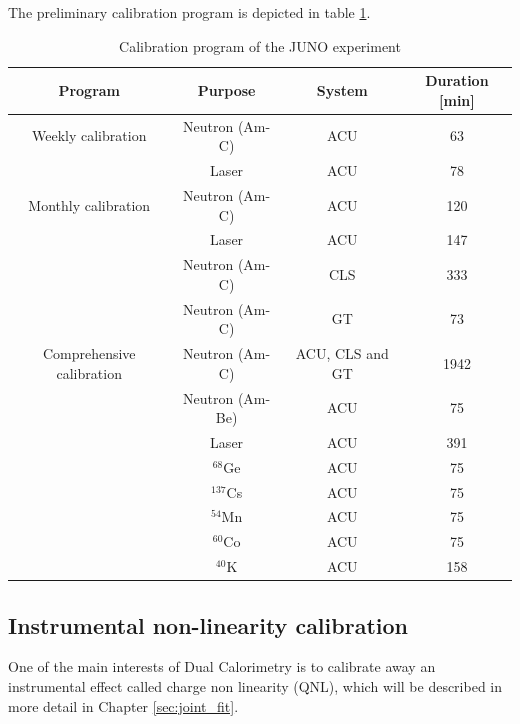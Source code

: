 \documentclass[../main.tex]{subfiles}
\begin{document}
The preliminary calibration program is depicted in table \ref{tab:juno:calib_prog}.

\begin{table}[ht]
  \centering
  \begin{tabular}{c c c c}
    \hline
    Program & Purpose & System & Duration [min] \\
    \hline
    Weekly calibration & Neutron (Am-C) & ACU & 63 \\
                       & Laser & ACU & 78  \\
                       \hline
    Monthly calibration & Neutron (Am-C) & ACU & 120 \\
                        & Laser  & ACU  & 147 \\
                        & Neutron (Am-C) & CLS & 333 \\
                        & Neutron (Am-C) & GT  & 73  \\
                        \hline
    Comprehensive calibration & Neutron (Am-C) & ACU, CLS and GT & 1942 \\
                              & Neutron (Am-Be) & ACU & 75 \\
                              & Laser & ACU & 391 \\
                              & $^{68}$Ge & ACU & 75 \\
                              & $^{137}$Cs & ACU & 75 \\
                              & $^{54}$Mn & ACU & 75 \\
                              & $^{60}$Co & ACU & 75 \\
                              & $^{40}$K & ACU & 158 \\
    \hline
  \end{tabular}
  \caption{Calibration program of the JUNO experiment}
  \label{tab:juno:calib_prog}
\end{table}

\subsection{Instrumental non-linearity calibration}
\label{sec:juno:instr_nl}

One of the main interests of Dual Calorimetry is to calibrate away an instrumental effect called charge non linearity (QNL), which will be described in more detail in Chapter \ref{sec:joint_fit}.
\end{document}
